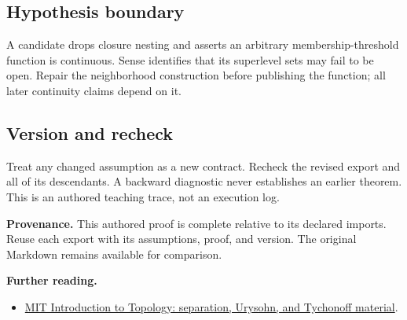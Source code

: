 \documentclass[preprint,12pt,aps,pra,showkeys,amsmath,amssymb,superscriptaddress,floatfix]{revtex4-2}
\theoremstyle{definition}
\theoremstyle{remark}
\providecommand{\tightlist}{\setlength{\itemsep}{2pt}\setlength{\parskip}{0pt}}
\begin{document}
\subsection{Hypothesis boundary}
A candidate drops closure nesting and asserts an arbitrary
membership-threshold function is continuous. Sense identifies that its
superlevel sets may fail to be open. Repair the neighborhood
construction before publishing the function; all later continuity claims
depend on it.

\subsection{Version and recheck}
Treat any changed assumption as a new contract. Recheck the revised
export and all of its descendants. A backward diagnostic never
establishes an earlier theorem. This is an authored teaching trace, not
an execution log.

\par\medskip\begingroup\small\linespread{1.0}\selectfont\noindent\textbf{Provenance.} This authored proof is complete relative to its declared imports. Reuse
each export with its assumptions, proof, and version. The original
Markdown remains available for comparison.
\par\endgroup

\par\smallskip\begingroup\small\linespread{1.0}\selectfont\noindent\textbf{Further reading.} \begin{itemize}
\tightlist
\item
  \href{https://ocw.mit.edu/courses/18-901-introduction-to-topology-fall-2004/pages/lecture-notes/}{MIT
  Introduction to Topology: separation, Urysohn, and Tychonoff
  material}.
\end{itemize}\par\endgroup
\end{document}
